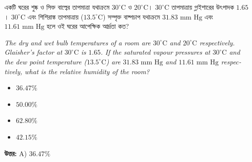 \documentclass[12pt, a4paper]{article}
\begin{document}
\begin{tcolorbox}[questionbox={প্রশ্ন (Question) 11}]
    \noindent
    একটি ঘরের শুষ্ক ও সিক্ত বাল্বের তাপমাত্রা যথাক্রমে $30^\circ\text{C}$ ও $20^\circ\text{C}$। $30^\circ\text{C}$ তাপমাত্রায় গ্লাইশারের উৎপাদক $1.65$। $30^\circ\text{C}$ এবং শিশিরাঙ্ক তাপমাত্রায় ($13.5^\circ\text{C}$) সম্পৃক্ত বাষ্পচাপ যথাক্রমে $31.83\text{ mm Hg}$ এবং $11.61\text{ mm Hg}$ হলে ওই ঘরের আপেক্ষিক আর্দ্রতা কত?
    
    \vspace{0.8em}
    \begin{english}
    \noindent\textit{\color{darkgray}
    The dry and wet bulb temperatures of a room are $30^\circ\text{C}$ and $20^\circ\text{C}$ respectively. Glaisher's factor at $30^\circ\text{C}$ is $1.65$. If the saturated vapour pressures at $30^\circ\text{C}$ and the dew point temperature ($13.5^\circ\text{C}$) are $31.83\text{ mm Hg}$ and $11.61\text{ mm Hg}$ respectively, what is the relative humidity of the room?
    }
    \end{english}
\end{tcolorbox}

\begin{itemize}[label={}, leftmargin=1cm, itemsep=0.5em]
    \item[\textbf{A)}] $36.47\%$
    \item[\textbf{B)}] $50.00\%$
    \item[\textbf{C)}] $62.80\%$
    \item[\textbf{D)}] $42.15\%$
\end{itemize}

\vspace{0.5em}
\begin{tcolorbox}[answerbox]
    \textbf{\color{success} উত্তর:} A) $36.47\%$
\end{tcolorbox}
\vspace{1em}
\end{document}
